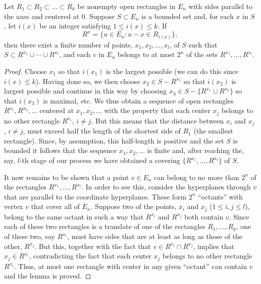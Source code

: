 \begin{lemma}\label{lem:c2-3-3}
Let $R_1 \subset R_2 \subset \dots \subset R_k$ be nonempty open rectangles in $E_n$ with sides parallel to the axes and centered at $0$. Suppose $S \subset E_n$ is a bounded set and, for each $x$ in $S$, let $i(x)$ be an integer satisfying $1 \leq i(x) \leq k$. If
\[
R^x = \{u \in E_n : u - x \in R_{i(x)}\},
\]
then there exist a finite number of points, $x_1, x_2, \dots, x_l$, of $S$ such that $S \subset R^{x_1} \cup \cdots \cup R^{x_l}$, and each $v$ in $E_n$ belongs to at most $2^n$ of the sets $R^{x_1}, \dots, R^{x_l}$.
\end{lemma}

\begin{proof}
Choose $x_1$ so that $i(x_1)$ is the largest possible (we can do this since $i(x) \leq k$). Having done so, we then choose $x_2 \in S - R^{x_1}$ so that $i(x_2)$ is largest possible and continue in this way by choosing $x_3 \in S - \{R^{x_1} \cup R^{x_2}\}$ so that $i(x_3)$ is maximal, etc. We thus obtain a sequence of open rectangles $R^{x_1}, R^{x_2}, \dots$ centered at $x_1, x_2, \dots$ with the property that each center $x_j$ belongs to no other rectangle $R^{x_i}$, $i \neq j$. But this means that the distance between $x_i$ and $x_j$, $i \neq j$, must exceed half the length of the shortest side of $R_1$ (the smallest rectangle). Since, by assumption, this half-length is positive and the set $S$ is bounded it follows that the sequence $x_1, x_2, \dots$ is finite and, after reaching the, say, $l$-th stage of our process we have obtained a covering $\{R^{x_1}, \dots, R^{x_l}\}$ of $S$.

It now remains to be shown that a point $v \in E_n$ can belong to no more than $2^n$ of the rectangles $R^{x_1}, \dots, R^{x_l}$. In order to see this, consider the hyperplanes through $v$ that are parallel to the coordinate hyperplanes. These form $2^n$ ``octants'' with vertex $v$ that cover all of $E_n$. Suppose two of the points, $x_i$ and $x_j$ ($1 \leq i, j \leq l$), belong to the same octant in such a way that $R^{x_i}$ and $R^{x_j}$ both contain $v$. Since each of these two rectangles is a translate of one of the rectangles $R_1, \dots, R_k$, one of these two, say $R^{x_i}$, must have sides that are at least as long as those of the other, $R^{x_j}$. But this, together with the fact that $v \in R^{x_i} \cap R^{x_j}$, implies that $x_j \in R^{x_i}$, contradicting the fact that each center $x_j$ belongs to no other rectangle $R^{x_i}$. Thus, at most one rectangle with center in any given ``octant'' can contain $v$ and the lemma is proved.
\end{proof}

